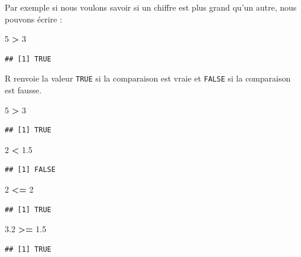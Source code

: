 \documentclass[
]{book}
\newenvironment{Shaded}{\begin{snugshade}}{\end{snugshade}}
\newcommand{\DecValTok}[1]{\textcolor[rgb]{0.00,0.00,0.81}{#1}}
\newcommand{\FloatTok}[1]{\textcolor[rgb]{0.00,0.00,0.81}{#1}}
\newcommand{\OperatorTok}[1]{\textcolor[rgb]{0.81,0.36,0.00}{\textbf{#1}}}
\newcommand{\StringTok}[1]{\textcolor[rgb]{0.31,0.60,0.02}{#1}}
\begin{document}
Par exemple si nous voulons savoir si un chiffre est plus grand qu'un autre, nous pouvons écrire :

\begin{Shaded}
\begin{Highlighting}[]
\DecValTok{5} \OperatorTok{>}\StringTok{ }\DecValTok{3} 
\end{Highlighting}
\end{Shaded}

\begin{verbatim}
## [1] TRUE
\end{verbatim}

R renvoie la valeur \texttt{TRUE} si la comparaison est vraie et \texttt{FALSE} si la comparaison est fausse.

\begin{Shaded}
\begin{Highlighting}[]
\DecValTok{5} \OperatorTok{>}\StringTok{ }\DecValTok{3}
\end{Highlighting}
\end{Shaded}

\begin{verbatim}
## [1] TRUE
\end{verbatim}

\begin{Shaded}
\begin{Highlighting}[]
\DecValTok{2} \OperatorTok{<}\StringTok{ }\FloatTok{1.5}
\end{Highlighting}
\end{Shaded}

\begin{verbatim}
## [1] FALSE
\end{verbatim}

\begin{Shaded}
\begin{Highlighting}[]
\DecValTok{2} \OperatorTok{<=}\StringTok{ }\DecValTok{2}
\end{Highlighting}
\end{Shaded}

\begin{verbatim}
## [1] TRUE
\end{verbatim}

\begin{Shaded}
\begin{Highlighting}[]
\FloatTok{3.2} \OperatorTok{>=}\StringTok{ }\FloatTok{1.5}
\end{Highlighting}
\end{Shaded}

\begin{verbatim}
## [1] TRUE
\end{verbatim}
\end{document}
